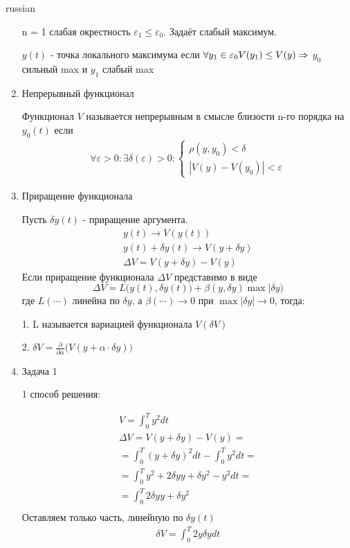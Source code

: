 \documentclass{article}
\begin{document}
\begin{otherlanguage*}{russian}
\begin{enumerate}
n = 1 слабая окрестность $\varepsilon_1 \le \varepsilon_0 $. Задаёт слабый максимум.

$y(t)$ - точка локального максимума если $\forall y_1 \in \varepsilon_0 \\
V(y_1) \le V(y) \Rightarrow$ $y_0$ сильный max и $y_1$ слабый max   

\item Непрерывный функционал

Функционал $V$ называется непрерывным в смысле близости n-го порядка на $y_0(t)$ если 
\begin{align}
\forall \varepsilon > 0:\exists \delta (\varepsilon) > 0: 
\begin{cases}\rho(y, y_0) < \delta \\
|V(y) - V(y_0) | < \varepsilon \end{cases}
\end{align}
\item Приращение функционала 

Пусть $\delta y(t)$ - приращение аргумента. 
\begin{align}
y(t) \rightarrow V(y(t)) \\
y(t) + \delta y(t) \rightarrow V(y + \delta y) \\
\Delta V = V(y + \delta y) - V(y) 
\end{align}
Если приращение функционала $\Delta V$ представимо в виде 
\begin{equation}
\Delta V = L\Big( y(t), \delta y(t) \Big) + \beta (y, \delta y) \max | \delta y) 
\end{equation}
где $L(\cdots)$ линейна по $\delta y$, а $\beta(\cdots) \rightarrow 0$ при $\max | \delta y| \rightarrow 0 $, тогда: 

1. L называется вариацией функционала $ V (\delta V) $

2. $\delta V = \frac{\partial}{\partial \alpha} \big( V(y + \alpha \cdot \delta y) \big)$

\item Задача 1

1 способ решения: 

\begin{align}
V = \int_0^T y^2 dt \\
\Delta V = V (y + \delta y) - V(y) =  \\
= \int_0^T (y + \delta y) ^2 dt - \int_0^T y^2 dt = \\
= \int_0^T y ^ 2 + 2 \delta y y + \delta y^2 - y ^ 2 dt = \\
= \int_0^T 2 \delta y y + \delta y^2 \\
\end{align}
Оставляем только часть, линейную по $\delta y(t)$
\begin{align}
\delta V = \int_0^T 2 y \delta y dt 
\end{align}


\end{enumerate}
\end{otherlanguage*}
\end{document}
